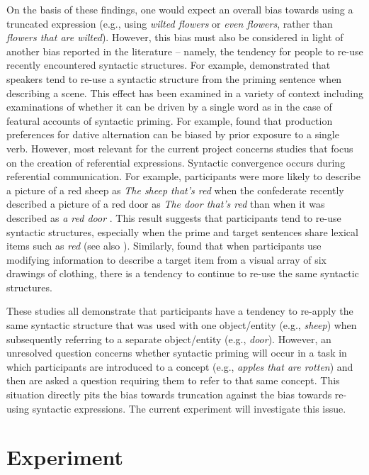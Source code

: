 \documentclass[output=paper]{langsci/langscibook}
\begin{document}
On the basis of these findings, one would expect an overall bias
towards using a truncated expression (e.g., using \textit{wilted
  flowers} or \textit{even flowers}, rather than \textit{flowers that
  are wilted}).  However, this bias must also be considered in light
of another bias reported in the literature -- namely, the tendency for
people to re-use recently encountered syntactic structures. For
example, \citet{bock1986syntactic} demonstrated that speakers tend to re-use a
syntactic structure from the priming sentence when describing a
scene. This effect has been examined in a variety of context including
examinations of whether it can be driven by a single word as in the
case of featural accounts of syntactic priming. For example, \citet{melinger2005lexically} found that production preferences for dative
alternation can be biased by prior exposure to a single verb. However,
most relevant for the current project concerns studies that focus on
the creation of referential expressions. Syntactic convergence occurs
during referential communication. For example, participants were more
likely to describe a picture of a red sheep as \textit{The sheep that’s red}
when the confederate recently described a picture of a red door as
\textit{The door that’s red} than when it was described as \textit{a red door} \citep{cleland2003use}. 
This result suggests that participants tend to re-use syntactic structures, especially when the prime and
target sentences share lexical items such as \textit{red} (see also
\citealt{chang2003can}). Similarly, \citet{tarenskeen2015overspecification} found that when participants use modifying information
to describe a target item from a visual array of six drawings of
clothing, there is a tendency to continue to re-use the same syntactic
structures.

These studies all demonstrate that participants have a tendency to
re-apply the same syntactic structure that was used with one
object/entity (e.g., \textit{sheep}) when subsequently referring to a
separate object/entity (e.g., \textit{door}). However, an unresolved
question concerns whether syntactic priming will occur in a task in
which participants are introduced to a concept (e.g., \textit{apples
  that are rotten}) and then are asked a question requiring them to
refer to that same concept.  This situation directly pits the bias
towards truncation against the bias towards re-using syntactic
expressions. The current experiment will investigate this issue.\largerpage


\section{Experiment}
\end{document}
